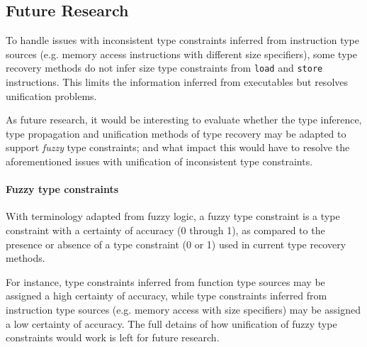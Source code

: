 
\subsection{Future Research}


To handle issues with inconsistent type constraints inferred from instruction type sources (e.g. memory access instructions with different size specifiers), some type recovery methods do not infer size type constraints from \texttt{load} and \texttt{store} instructions. This limits the information inferred from executables but resolves unification problems.

As future research, it would be interesting to evaluate whether the type inference, type propagation and unification methods of type recovery may be adapted to support \textit{fuzzy} type constraints; and what impact this would have to resolve the aforementioned issues with unification of inconsistent type constraints.

\paragraph{Fuzzy type constraints} With terminology adapted from fuzzy logic, a fuzzy type constraint is a type constraint with a certainty of accuracy (0 through 1), as compared to the presence or absence of a type constraint (0 or 1) used in current type recovery methods.

For instance, type constraints inferred from function type sources may be assigned a high certainty of accuracy, while type constraints inferred from instruction type sources (e.g. memory access with size specifiers) may be assigned a low certainty of accuracy. The full detains of how unification of fuzzy type constraints would work is left for future research.
